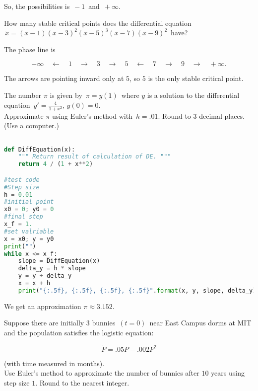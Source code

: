 So, the possibilities is $\, -1 \,$ and $\, + \infty $.

\begin{problem}
  How many stable critical points does the differential equation
  $\, \dot x =(x-1) (x-3)^2 (x-5)^3 (x-7) (x-9)^2 \,$ have?
\end{problem}

The phase line is

\begin{equation*}
  -\infty \quad \longleftarrow \quad 1 \quad \longrightarrow
  \quad 3 \quad \longrightarrow \quad 5 \quad \longleftarrow
  \quad 7 \quad \longrightarrow \quad 9 \quad \longrightarrow \quad +\infty .
\end{equation*}

The arrows are pointing inward only at $5$, so $5$ is the only stable critical point.

\begin{problem}
  The number $\pi$ is given by $\, \pi = y(1) \,$ where $y$ is a solution to
  the differential equation $\, y' = \frac{4}{1+x^2}, \,  y(0) = 0$.\\
  Approximate $\pi$ using Euler's method with $\, h=.01$.
  Round to $3$ decimal places. (Use a computer.)
\end{problem}

\begin{lstlisting}[language=Python]

def DiffEquation(x):
    """ Return result of calculation of DE. """
    return 4 / (1 + x**2)

#test code
#Step size
h = 0.01
#initial point
x0 = 0; y0 = 0
#final step
x_f = 1.
#set valriable
x = x0; y = y0
print("")
while x <= x_f:
    slope = DiffEquation(x)
    delta_y = h * slope
    y = y + delta_y
    x = x + h 
    print("{:.5f}, {:.5f}, {:.5f}, {:.5f}".format(x, y, slope, delta_y))

\end{lstlisting}

We get an approximation $\pi \approx 3.152$.

\begin{problem}
  Suppose there are initially $3$ bunnies $\, (t=0) \,$ near East Campus dorms at MIT
  and the population satisfies the logistic equation:

  \begin{equation*}
    \displaystyle \dot P = .05P-.002P^2
  \end{equation*}

  (with time measured in months). \\
  
  Use Euler's method to approximate the number of bunnies after $10$ years using step size $1$.
  Round to the nearest integer.
\end{problem}

